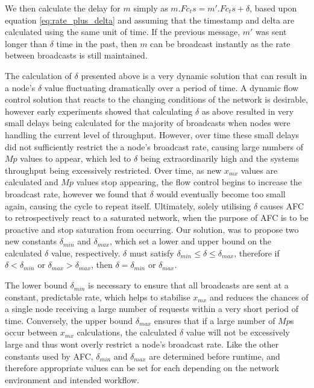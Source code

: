     We then calculate the delay for $m$ simply as $m.Fc_ts = m'.Fc_ts + \delta$, based upon equation \ref{eq:rate_plus_delta} and assuming that the timestamp and delta are calculated using the same unit of time.  If the previous message, $m'$ was sent longer than $\delta$ time in the past, then $m$ can be broadcast instantly as the rate between broadcasts is still maintained.  
    
    The calculation of $\delta$ presented above is a very dynamic solution that can result in a node's $\delta$ value fluctuating dramatically over a period of time.  A dynamic flow control solution that reacts to the changing conditions of the network is desirable, however early experiments showed that calculating $\delta$ as above resulted in very small delays being calculated for the majority of broadcasts when nodes were handling the current level of throughput.  However, over time these small delays did not sufficiently restrict the a node's broadcast rate, causing large numbers of $Mp$ values to appear, which led to $\delta$ being extraordinarily high and the systems throughput being excessively restricted.  Over time, as new $x_{mx}$ values are calculated and $Mp$ values stop appearing, the flow control begins to increase the broadcast rate, however we found that $\delta$ would eventually become too small again, causing the cycle to repeat itself.  Ultimately, solely utilising $\delta$ causes AFC to retrospectively react to a saturated network, when the purpose of AFC is to be proactive and stop saturation from occurring.  Our solution, was to propose two new constants $\delta_{min}$ and $\delta_{max}$, which set a lower and upper bound on the calculated $\delta$ value, respectively.  $\delta$ must satisfy $\delta_{min} \leq \delta \leq \delta_{max}$, therefore if $\delta < \delta_{min}$ or $\delta_{max} > \delta_{max}$, then $\delta = \delta_{min}$ or $\delta_{max}$.
    
    The lower bound $\delta_{min}$ is necessary to ensure that all broadcasts are sent at a constant, predictable rate, which helps to stabilise $x_{mx}$ and reduces the chances of a single node receiving a large number of requests within a very short period of time.  Conversely, the upper bound $\delta_{max}$ ensures that if a large number of $Mp$s occur between $x_{mx}$ calculations, the calculated $\delta$ value will not be excessively large and thus wont overly restrict a node's broadcast rate.  Like the other constants used by AFC, $\delta_{min}$ and $\delta_{max}$ are determined before runtime, and therefore appropriate values can be set for each depending on the network environment and intended workflow. 
    
